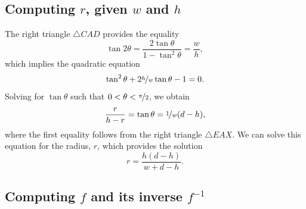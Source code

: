 \subsection{Computing $r$, given $w$ and $h$}
\label{ssec:compute_r}

The right triangle $\triangle CAD$ provides the equality \[ \tan{2\theta} =
\frac{2\tan{\theta}}{1-\tan^2{\theta}} = \frac{w}{h}, \] which implies the
quadratic equation \[ \tan^2{\theta} + 2\nicefrac{h}{w}\tan{\theta} - 1 = 0. \]
Solving for $\tan{\theta}$ such that $0 < \theta < \nicefrac{\pi}{2}$, we obtain
\[ \frac{r}{h-r} = \tan{\theta} = \nicefrac{1}{w}(d-h), \] where the first 
equality follows from the right triangle $\triangle EAX$. We can solve this
equation for the radius, $r$, which provides the solution
%
\begin{equation}
  r = \frac{h(d-h)}{w+d-h}.
  \label{eq:radius}
\end{equation}

\subsection{Computing $f$ and its inverse $f^{-1}$}

